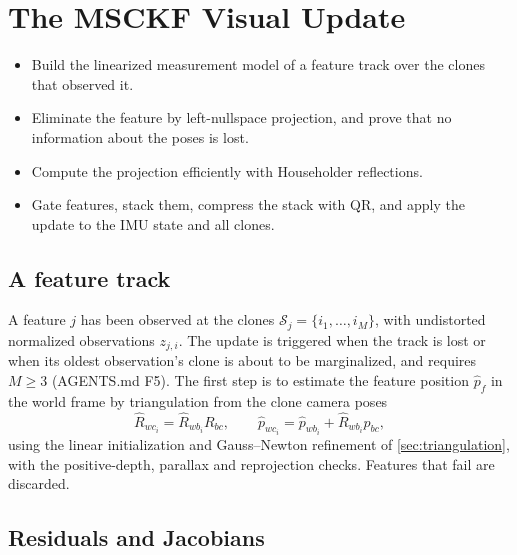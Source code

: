 \chapter{The MSCKF Visual Update}
\label{ch:msckfupdate}

\begin{objectives}
\begin{itemize}
  \item Build the linearized measurement model of a feature track over the clones that observed it.
  \item Eliminate the feature by left-nullspace projection, and prove that no information about the poses is lost.
  \item Compute the projection efficiently with Householder reflections.
  \item Gate features, stack them, compress the stack with QR, and apply the update to the IMU state and all clones.
\end{itemize}
\end{objectives}

\section{A feature track}

A feature $j$ has been observed at the clones $\mathcal{S}_j = \{i_1, \dots, i_M\}$, with undistorted normalized observations
$z_{j,i}$. The update is triggered when the track is lost or when its oldest observation's clone is about to be marginalized,
and requires $M \ge 3$ (AGENTS.md F5). The first step is to estimate the feature position $\hat p_f$ in the world frame by
triangulation from the clone camera poses
\begin{equation}
  \hat R_{wc_i} = \hat R_{wb_i}R_{bc}, \qquad \hat p_{wc_i} = \hat p_{wb_i} + \hat R_{wb_i}p_{bc},
\end{equation}
using the linear initialization and Gauss--Newton refinement of \cref{sec:triangulation}, with the positive-depth, parallax and
reprojection checks. Features that fail are discarded.

\section{Residuals and Jacobians}

